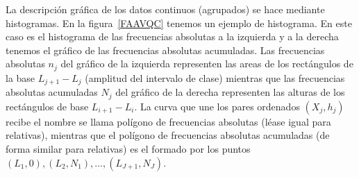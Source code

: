 \documentclass[12pt]{report}
\begin{document}
La descripción gráfica  de los datos continuos (agrupados) se hace mediante histogramas.
En la figura~\ref{FAAVQC} tenemos un ejemplo de histograma. En este caso es el histograma
de  las frecuencias absolutas a la izquierda y a la derecha tenemos el gráfico de las
frecuencias absolutas acumuladas. Las frecuencias absolutas $n_j$ del gráfico de la
izquierda representen las areas de los rectángulos de la base $L_{j+1}-L_j$ (amplitud del
intervalo de clase) mientras que las frecuencias absolutas acumuladas $N_j$ del gráfico
de la derecha representen las alturas de los rectángulos de base $L_{i+1}-L_i$. La curva
 que une los pares ordenados $(X_j,h_j)$ recibe el nombre
  se llama  polígono de frecuencias absolutas (léase igual para relativas), mientras que el polígono
  de frecuencias absolutas acumuladas (de forma similar para relativas) es el formado por los puntos
  $(L_1,0),(L_2,N_1),\ldots,(L_{J+1},N_J)$.
\end{document}
